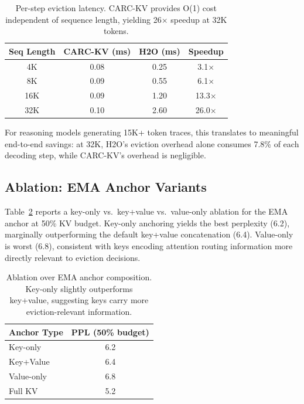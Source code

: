 \documentclass[11pt,a4paper]{article}
\begin{document}
\begin{table}[t]
\centering
\small
\begin{tabular}{cccc}
\toprule
\textbf{Seq Length} & \textbf{CARC-KV (ms)} & \textbf{H2O (ms)} & \textbf{Speedup} \\
\midrule
4K  & 0.08 & 0.25 & 3.1$\times$ \\
8K  & 0.09 & 0.55 & 6.1$\times$ \\
16K & 0.09 & 1.20 & 13.3$\times$ \\
32K & 0.10 & 2.60 & 26.0$\times$ \\
\bottomrule
\end{tabular}
\caption{Per-step eviction latency. CARC-KV provides O(1) cost independent of sequence length, yielding 26$\times$ speedup at 32K tokens.}
\label{tab:wallclock}
\end{table}

For reasoning models generating 15K+ token traces, this translates to meaningful end-to-end savings: at 32K, H2O's eviction overhead alone consumes 7.8\% of each decoding step, while CARC-KV's overhead is negligible.

\subsection{Ablation: EMA Anchor Variants}

Table~\ref{tab:ablation} reports a key-only vs.\ key+value vs.\ value-only ablation for the EMA anchor at 50\% KV budget.
Key-only anchoring yields the best perplexity (6.2), marginally outperforming the default key+value concatenation (6.4).
Value-only is worst (6.8), consistent with keys encoding attention routing information more directly relevant to eviction decisions.

\begin{table}[t]
\centering
\small
\begin{tabular}{lc}
\toprule
\textbf{Anchor Type} & \textbf{PPL (50\% budget)} \\
\midrule
Key-only      & 6.2 \\
Key+Value     & 6.4 \\
Value-only    & 6.8 \\
\midrule
Full KV       & 5.2 \\
\bottomrule
\end{tabular}
\caption{Ablation over EMA anchor composition. Key-only slightly outperforms key+value, suggesting keys carry more eviction-relevant information.}
\label{tab:ablation}
\end{table}
\end{document}
